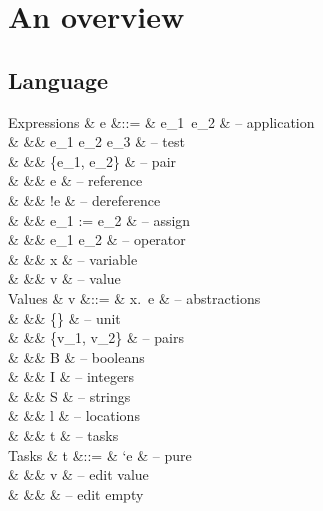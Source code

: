 
\newpage
\section{An overview}


\subsection{Language}

\begin{grammar}
  Expressions
    & e      &::= & e_1\ e_2                    & – application \\
    &        &\mid& \If e_1 \Then e_2 \Else e_3 & – test \\
    &        &\mid& \{e_1, e_2\}                & – pair \\
    &        &\mid& \Ref e                      & – reference \\
    &        &\mid& !e                          & – dereference \\
    &        &\mid& e_1 := e_2                  & – assign \\
    &        &\mid& e_1 \star e_2               & – operator \\
    &        &\mid& x                           & – variable \\
    &        &\mid& v                           & – value \\
  Values
    & v      &::= & \lambda x.\ e               & – abstractions \\
    &        &\mid& \{\}                        & – unit \\
    &        &\mid& \{v_1, v_2\}                & – pairs \\
    &        &\mid& B \in \BB                   & – booleans \\
    &        &\mid& I \in \ZZ                   & – integers \\
    &        &\mid& S \in \SS                   & – strings \\
    &        &\mid& l                           & – locations \\
    &        &\mid& t                           & – tasks \\
  Tasks
    & t      &::= & `e                          & – pure \\
    &        &\mid& \Edit v                     & – edit value \\
    &        &\mid& \Empty \tau                 & – edit empty \\

\end{grammar}
